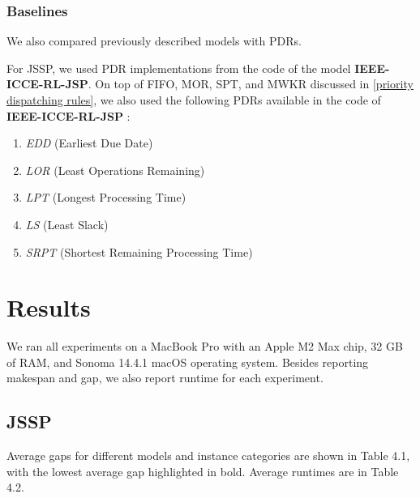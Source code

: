 \subsubsection{Baselines}
We also compared previously described models with PDRs.
\par
For JSSP, we used PDR implementations from the code of the model \textbf{IEEE-ICCE-RL-JSP}. On top of FIFO, MOR, SPT, and MWKR discussed in \ref{priority dispatching rules}, we also used the following PDRs available in the code of \textbf{IEEE-ICCE-RL-JSP} \cite{github_ieee_icce_rl_jsp}:
\begin{enumerate}
    \item \textit{EDD} (Earliest Due Date)
    \item \textit{LOR} (Least Operations Remaining)
    \item \textit{LPT} (Longest Processing Time)
    \item \textit{LS} (Least Slack)
    \item \textit{SRPT} (Shortest Remaining Processing Time)
\end{enumerate}

\section{Results}
We ran all experiments on a MacBook Pro with an Apple M2 Max chip, 32 GB of RAM, and Sonoma 14.4.1 macOS operating system. Besides reporting makespan and gap, we also report runtime for each experiment. 

\subsection{JSSP}
Average gaps for different models and instance categories are shown in Table 4.1, with the lowest average gap highlighted in bold. Average runtimes are in Table 4.2. 

